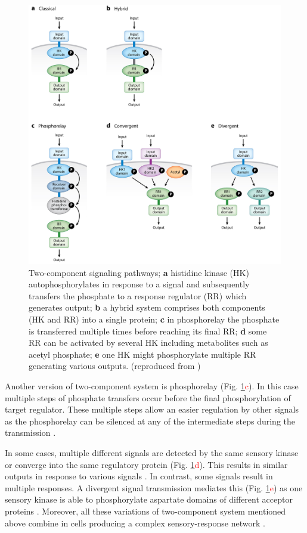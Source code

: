 \begin{figure}[h!]
  \centering
  \includegraphics[scale=0.85]{text/Pictures/TwoComponent.jpeg}
	\caption{Two-component signaling pathways; \textbf{a} histidine kinase (HK) autophosphorylates in response to a signal and subsequently transfers the phosphate to a response regulator (RR) which generates output; \textbf{b} a hybrid system comprises both components (HK and RR) into a single protein; \textbf{c} in phosphorelay the phosphate is transferred multiple times before reaching its final RR; \textbf{d} some RR can be activated by several HK including metabolites such as acetyl phosphate; \textbf{e} one HK might phosphorylate multiple RR generating various outputs. (reproduced from \cite{groisman2016feedback})}
	\label{two}
\end{figure}

Another version of two-component system is phosphorelay (Fig. \ref{two}\textcolor{red}{c}).
In this case multiple steps of phosphate transfers occur before the final phosphorylation of target regulator.
These multiple steps allow an easier regulation by other signals as the phosphorelay can be silenced at any of the intermediate steps during the transmission \cite{perego2001pentapeptide, groisman2016feedback}.

In some cases, multiple different signals are detected by the same sensory kinase or converge into the same regulatory protein (Fig. \ref{two}\textcolor{red}{d}).
This results in similar outputs in response to various signals \cite{kaczmarczyk2014complex, chambonnier2016hybrid}.
In contrast, some signals result in multiple responses.
A divergent signal transmission mediates this (Fig. \ref{two}\textcolor{red}{e}) as one sensory kinase is able to phosphorylate aspartate domains of different acceptor proteins \cite{mika2005two, groisman2016feedback}.
Moreover, all these variations of two-component system mentioned above combine in cells producing a complex sensory-response network \cite{kaczmarczyk2014complex, chambonnier2016hybrid}.

